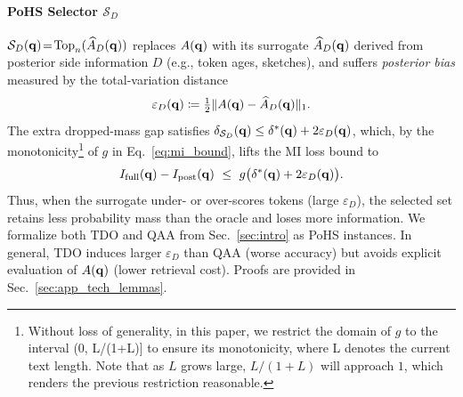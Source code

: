 \paragraph{PoHS Selector $\mathcal S_D$}
$\mathcal S_D(\mathbf{q})\!=\!\operatorname*{Top}_n(\widehat A_D(\mathbf{q}))$ replaces $A(\mathbf{q})$ with its surrogate $\widehat A_D(\mathbf{q})$ derived from posterior side information $D$ (e.g., token ages, sketches), and suffers \emph{posterior bias} measured by the total-variation distance
\begin{equation}
\label{eq:pohs_bias}
    \varepsilon_{D}(\mathbf{q})\coloneqq \tfrac12\|A(\mathbf{q})-\widehat A_D(\mathbf{q})\|_1 .
\end{equation}
The extra dropped-mass gap satisfies $\delta_{\mathcal S_D}(\mathbf{q}) \le \delta^{*}(\mathbf{q})+2\varepsilon_{D}(\mathbf{q})$, which, by the monotonicity\footnote{Without loss of generality, in this paper, we restrict the domain of $g$ to the interval (0, L/(1+L)] to ensure its monotonicity, where L denotes the current text length. Note that as $L$ grows large,  $L/(1+L)$ will approach $1$, which renders the previous restriction reasonable.} of $g$ in Eq.~\eqref{eq:mi_bound}, lifts the MI loss bound to
\begin{equation}
\label{eq:posh_bound}
    I_{\mathrm{full}}(\bq)-I_{\text{post}}(\bq)\ \le\ g\big(\delta^{*}(\bq)+2\varepsilon_{D}(\bq)\big).
\end{equation}
Thus, when the surrogate under- or over-scores tokens (large $\varepsilon_D$), the selected set retains less probability mass than the oracle and loses more information. We formalize both TDO and QAA from Sec.~\ref{sec:intro} as PoHS instances. In general, TDO induces larger $\varepsilon_D$ than QAA (worse accuracy) but avoids explicit evaluation of $A(\mathbf{q})$ (lower retrieval cost). Proofs are provided in Sec.~\ref{sec:app_tech_lemmas}. 



